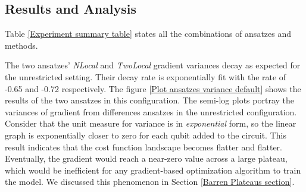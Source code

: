 \subsection{Results and Analysis} \label{Result section}

Table \ref{Experiment summary table} states all the combinations of ansatzes and methods.

The two ansatzes' \emph{NLocal} and \emph{TwoLocal} gradient variances decay as expected for the unrestricted setting.
Their decay rate is exponentially fit with the rate of -0.65 and -0.72 respectively.
The figure \ref{Plot ansatzes variance default} shows the results of the two ansatzes in this configuration.
The semi-log plots portray the variances of gradient from differences ansatzes in the unrestricted configuration.
Consider that the unit measure for variance is in \emph{exponential} form, so the linear graph is exponentially closer to zero for each qubit added to the circuit.
This result indicates that the cost function landscape becomes flatter and flatter.
Eventually, the gradient would reach a near-zero value across a large plateau, which would be inefficient for any gradient-based optimization algorithm to train the model.
We discussed this phenomenon in Section \ref{Barren Plateaus section}.


